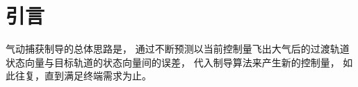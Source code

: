 \section{引\quad 言}
气动捕获制导的总体思路是，
通过不断预测以当前控制量飞出大气后的过渡轨道状态向量与目标轨道的状态向量间的误差，
代入制导算法来产生新的控制量，
如此往复，直到满足终端需求为止。
